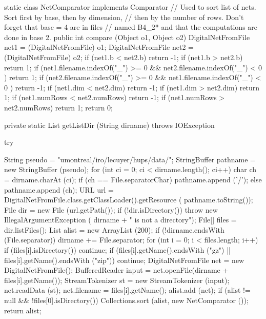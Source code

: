 \begin{code} \begin{hide}

   static class NetComparator implements Comparator {
      // Used to sort list of nets. Sort first by base, then by dimension,
      // then by the number of rows. Don't forget that base = 4 are in files
      // named B4_2* and that the computations are done in base 2.
      public int compare (Object o1, Object o2) {
         DigitalNetFromFile net1 = (DigitalNetFromFile) o1;
         DigitalNetFromFile net2 = (DigitalNetFromFile) o2;
         if (net1.b < net2.b)
            return -1;
         if (net1.b > net2.b)
            return 1;
         if (net1.filename.indexOf("_") >= 0 &&
             net2.filename.indexOf("_") < 0 )
            return 1;
         if (net2.filename.indexOf("_") >= 0 &&
             net1.filename.indexOf("_") < 0 )
            return -1;
         if (net1.dim < net2.dim)
            return -1;
         if (net1.dim > net2.dim)
            return 1;
         if (net1.numRows < net2.numRows)
            return -1;
         if (net1.numRows > net2.numRows)
            return 1;
         return 0;
      }
   }


   private static List getListDir (String dirname) throws IOException {
      try {
         String pseudo = "umontreal/iro/lecuyer/hups/data/";
         StringBuffer pathname = new StringBuffer (pseudo);
         for (int ci = 0; ci < dirname.length(); ci++) {
            char ch = dirname.charAt (ci);
            if (ch == File.separatorChar)
               pathname.append ('/');
            else
               pathname.append (ch);
         }
         URL url = DigitalNetFromFile.class.getClassLoader().getResource (
                      pathname.toString());
         File dir = new File (url.getPath());
         if (!dir.isDirectory())
            throw new IllegalArgumentException (
               dirname + " is not a directory");
         File[] files = dir.listFiles();
         List alist = new ArrayList (200);
         if (!dirname.endsWith (File.separator))
            dirname += File.separator;
         for (int i = 0; i < files.length; i++) {
            if (files[i].isDirectory())
               continue;
            if (files[i].getName().endsWith ("gz") ||
                files[i].getName().endsWith ("zip"))
               continue;
            DigitalNetFromFile net = new DigitalNetFromFile();
            BufferedReader input = net.openFile(dirname + files[i].getName());
            StreamTokenizer st = new StreamTokenizer (input);
            net.readData (st);
            net.filename = files[i].getName();
            alist.add (net);
         }
         if (alist != null && !files[0].isDirectory())
            Collections.sort (alist, new NetComparator ());
         return alist;

}}
\end{hide}
\end{code}
